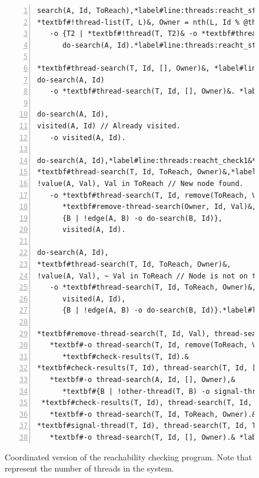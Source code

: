 \begin{figure}[h]
\begin{Verbatim}[numbers=left,fontsize=\codesize,commandchars=*\#\&]
search(A, Id, ToReach),*label#line:threads:reacht_start1&
*textbf#!thread-list(T, L)&, Owner = nth(L, Id % @threads) // Allocate search to a thread.
   -o {T2 | *textbf#!thread(T, T2)& -o *textbf#thread-search(T2, Id, ToReach, Owner)&},*label#line:threads:reacht_threads&
      do-search(A, Id).*label#line:threads:reacht_start2&

*textbf#thread-search(T, Id, [], Owner)&, *label#line:threads:reacht_prune1& // Nothing left to find.
do-search(A, Id)
   -o *textbf#thread-search(T, Id, [], Owner)&. *label#line:threads:reacht_prune2&

do-search(A, Id),
visited(A, Id) // Already visited.
   -o visited(A, Id).

do-search(A, Id),*label#line:threads:reacht_check1&*label#line:bfs_join1&
*textbf#thread-search(T, Id, ToReach, Owner)&,*label#line:threads:reacht_join2&
!value(A, Val), Val in ToReach // New node found.
   -o *textbf#thread-search(T, Id, remove(ToReach, Val), Owner)&,
      *textbf#remove-thread-search(Owner, Id, Val)&, // Tell owner thread about it.*label#line:threads:reacht_remove&
      {B | !edge(A, B) -o do-search(B, Id)},
      visited(A, Id).

do-search(A, Id),
*textbf#thread-search(T, Id, ToReach, Owner)&,
!value(A, Val), ~ Val in ToReach // Node is not on the list.
   -o *textbf#thread-search(T, Id, ToReach, Owner)&,
      visited(A, Id),
      {B | !edge(A, B) -o do-search(B, Id)}.*label#line:threads:reacht_check2&

*textbf#remove-thread-search(T, Id, Val), thread-search(T, Id, ToReach, Owner)&
   *textbf#-o thread-search(T, Id, remove(ToReach, Val), Owner),&
      *textbf#check-results(T, Id).&
*textbf#check-results(T, Id), thread-search(T, Id, [], Owner)&*label#line:threads:reacht_reached1&
   *textbf#-o thread-search(A, Id, [], Owner),&
      *textbf#{B | !other-thread(T, B) -o signal-thread(B, Id)}.&*label#line:threads:reacht_reached2&
 *textbf#check-results(T, Id), thread-search(T, Id, ToReach, Owner), ToReach <> []&
   *textbf#-o thread-search(T, Id, ToReach, Owner).&
*textbf#signal-thread(T, Id), thread-search(T, Id, ToReach, Owner)& // Thread knows search is done.*label#line:threads:reacht_knows1&
   *textbf#-o thread-search(T, Id, [], Owner).& *label#line:threads:reacht_knows2&
\end{Verbatim}
\caption{Coordinated version of the reachability checking program. Note
that  represent the number of threads in the system.}
\label{code:threads:reach_threads}
\end{figure}

